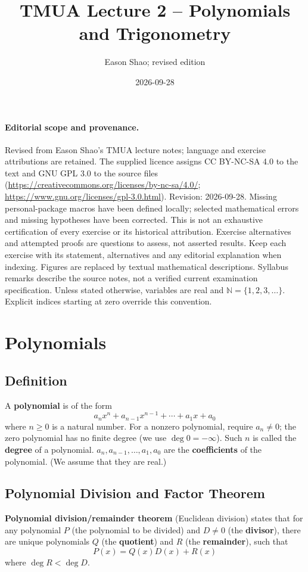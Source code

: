 \documentclass[11pt]{article}
\title{TMUA Lecture 2 -- Polynomials and Trigonometry}
\author{Eason Shao; revised edition}
\date{2026-09-28}
\theoremstyle{definition}
\theoremstyle{remark}
\newcommand{\pqty}[1]{\left(#1\right)}
\newcommand{\NN}{\mathbb{N}}
\begin{document}
\maketitle
\paragraph{Editorial scope and provenance.}
Revised from Eason Shao's TMUA lecture notes; language and exercise attributions are retained.
The supplied licence assigns CC BY-NC-SA 4.0 to the text and GNU GPL 3.0 to the source files
(\url{https://creativecommons.org/licenses/by-nc-sa/4.0/};
\url{https://www.gnu.org/licenses/gpl-3.0.html}).
Revision: 2026-09-28. Missing personal-package macros have been defined locally;
selected mathematical errors and missing hypotheses have been corrected.
This is not an exhaustive certification of every exercise or its historical attribution.
Exercise alternatives and attempted proofs are questions to assess, not asserted results.
Keep each exercise with its statement, alternatives and any editorial explanation when indexing.
Figures are replaced by textual mathematical descriptions. Syllabus remarks describe the
source notes, not a verified current examination specification.
Unless stated otherwise, variables are real and \(\NN=\{1,2,3,\ldots\}\).
Explicit indices starting at zero override this convention.

\tableofcontents


\section{Polynomials}\label{tmua-2-section-001}
\subsection{Definition}\label{tmua-2-subsection-001}
A \textbf{polynomial} is of the form
\[
    a_n x^n + a_{n - 1} x^{n - 1} + \cdots + a_1 x + a_0
\]
where \(n \geq 0\) is a natural number. For a nonzero polynomial, require \(a_n\ne0\); the zero polynomial has no finite degree (we use \(\deg0=-\infty\)). Such \(n\) is called the \textbf{degree} of a polynomial. \(a_n, a_{n - 1}, \ldots, a_1, a_0\) are the \textbf{coefficients} of the polynomial. (We assume that they are real.)

\subsection{Polynomial Division and Factor Theorem}\label{tmua-2-subsection-002}
\textbf{Polynomial division/remainder theorem} (Euclidean division) states that for any polynomial \(P\) (the polynomial to be divided) and \(D \neq 0\) (the \textbf{divisor}), there are unique polynomials \(Q\) (the \textbf{quotient}) and \(R\) (the \textbf{remainder}), such that
\[
    P \pqty{x} = Q \pqty{x} D\pqty{x} + R \pqty{x}
\]
where \(\deg R < \deg D\).
\end{document}
